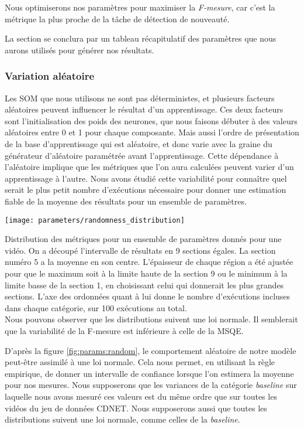 	Nous optimiserons nos paramètres pour maximiser la \textit{F-mesure}, car c'est la métrique la plus proche de la tâche de détection de nouveauté.
	
	La section se conclura par un tableau récapitulatif des paramètres que nous aurons utilisés pour générer nos résultats.

	\subsubsection{Variation aléatoire}

	Les SOM que nous utilisons ne sont pas déterministes, et plusieurs facteurs aléatoires peuvent influencer le résultat d'un apprentissage. Ces deux facteurs sont l'initialisation des poids des neurones, que nous faisons débuter à des valeurs aléatoires entre 0 et 1 pour chaque composante. Mais aussi l'ordre de présentation de la base d'apprentissage qui est aléatoire, et donc varie avec la graine du générateur d'aléatoire paramétrée avant l'apprentissage. Cette dépendance à l'aléatoire implique que les métriques que l'on aura calculées peuvent varier d'un apprentissage à l'autre. Nous avons étudié cette variabilité pour connaître quel serait le plus petit nombre d'exécutions nécessaire pour donner une estimation fiable de la moyenne des résultats pour un ensemble de paramètres. 

	\begin{figureth}
		\texttt{[image: parameters/randomness\_distribution]}
		\caption[Effet de l'aléatoire sur les métriques]{Distribution des métriques pour un ensemble de paramètres donnés pour une vidéo. On a découpé l'intervalle de résultats en 9 sections égales. La section numéro 5 a la moyenne en son centre. L'épaisseur de chaque région a été ajustée pour que le maximum soit à la limite haute de la section 9 ou le minimum à la limite basse de la section 1, en choisissant celui qui donnerait les plus grandes sections. L'axe des ordonnées quant à lui donne le nombre d'exécutions incluses dans chaque catégorie, sur 100 exécutions au total.\\
		
		Nous pouvons observer que les distributions suivent une loi normale. Il semblerait que la variabilité de la F-mesure est inférieure à celle de la MSQE.}\label{fig:params:random}
	\end{figureth}

	D'après la figure \ref{fig:params:random}, le comportement aléatoire de notre modèle peut-être assimilé à une loi normale. Cela nous permet, en utilisant la règle empirique, de donner un intervalle de confiance lorsque l'on estimera la moyenne pour nos mesures. Nous supposerons que les variances de la catégorie \textit{baseline} sur laquelle nous avons mesuré ces valeurs est du même ordre que sur toutes les vidéos du jeu de données CDNET. Nous supposerons aussi que toutes les distributions suivent une loi normale, comme celles de la \textit{baseline}.

